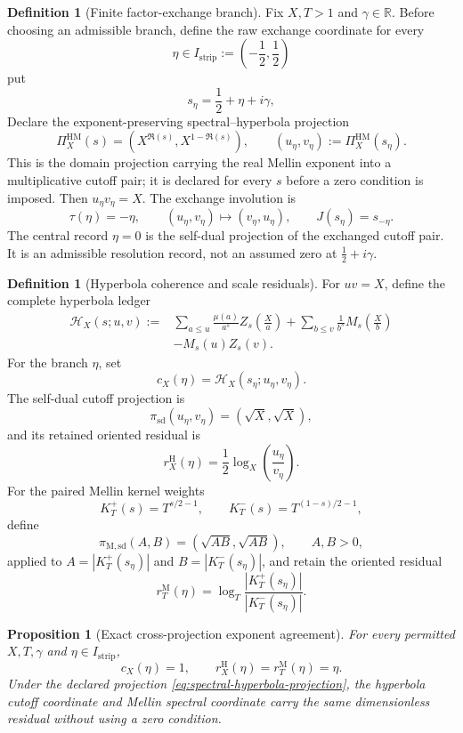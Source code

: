 \documentclass[11pt,a4paper]{article}
\newtheorem{proposition}[theorem]{Proposition}
\theoremstyle{definition}
\newtheorem{definition}[theorem]{Definition}
\newcommand{\Dual}{J}
\begin{document}
\begin{definition}[Finite factor-exchange branch]
\label{def:finite-factor-exchange-branch}
Fix $X,T>1$ and $\gamma\in\mathbb R$. Before choosing an admissible branch,
define the raw exchange coordinate for every
\[
  \eta\in I_{\mathrm{strip}}:=\left(-\frac12,\frac12\right)
\]
put
\[
  s_\eta=\frac12+\eta+i\gamma,
\]
Declare the exponent-preserving spectral--hyperbola projection
\begin{equation}
\label{eq:spectral-hyperbola-projection}
  \Pi_X^{\mathrm{HM}}(s)
  =
  \left(X^{\Re(s)},X^{1-\Re(s)}\right),
  \qquad
  (u_\eta,v_\eta)
  :=
  \Pi_X^{\mathrm{HM}}(s_\eta).
\end{equation}
This is the domain projection carrying the real Mellin exponent into a
multiplicative cutoff pair; it is declared for every $s$ before a zero
condition is imposed.
Then $u_\eta v_\eta=X$. The exchange involution is
\[
  \tau(\eta)=-\eta,
  \qquad
  (u_\eta,v_\eta)\longmapsto(v_\eta,u_\eta),
  \qquad
  \Dual(s_\eta)=s_{-\eta}.
\]
The central record $\eta=0$ is the self-dual projection of the exchanged
cutoff pair. It is an admissible resolution record, not an assumed zero at
$\tfrac12+i\gamma$.
\end{definition}

\begin{definition}[Hyperbola coherence and scale residuals]
\label{def:riemann-persistence-coordinates}
For $uv=X$, define the complete hyperbola ledger
\begin{align*}
  \mathcal H_X(s;u,v)
  :={}&
  \sum_{a\leq u}\frac{\mu(a)}{a^s}
    Z_s\!\left(\frac Xa\right)
  +\sum_{b\leq v}\frac1{b^s}
    M_s\!\left(\frac Xb\right)\\
  &-M_s(u)Z_s(v).
\end{align*}
For the branch $\eta$, set
\[
  c_X(\eta)=\mathcal H_X(s_\eta;u_\eta,v_\eta).
\]
The self-dual cutoff projection is
\[
  \pi_{\mathrm{sd}}(u_\eta,v_\eta)
  =(\sqrt X,\sqrt X),
\]
and its retained oriented residual is
\[
  r_X^{\mathrm H}(\eta)
  =
  \frac12\log_X\!\left(\frac{u_\eta}{v_\eta}\right).
\]
For the paired Mellin kernel weights
\[
  K_T^+(s)=T^{s/2-1},
  \qquad
  K_T^-(s)=T^{(1-s)/2-1},
\]
define
\[
  \pi_{\mathrm{M,sd}}(A,B)=(\sqrt{AB},\sqrt{AB}),
  \qquad A,B>0,
\]
applied to
$A=|K_T^+(s_\eta)|$ and $B=|K_T^-(s_\eta)|$, and retain the oriented residual
\[
  r_T^{\mathrm M}(\eta)
  =
  \log_T
  \frac{|K_T^+(s_\eta)|}{|K_T^-(s_\eta)|}.
\]
\end{definition}

\begin{proposition}[Exact cross-projection exponent agreement]
\label{prop:exact-branch-agreement}
For every permitted $X,T,\gamma$ and $\eta\in I_{\mathrm{strip}}$,
\begin{equation}
\label{eq:exact-branch-agreement}
  c_X(\eta)=1,
  \qquad
  r_X^{\mathrm H}(\eta)
  =r_T^{\mathrm M}(\eta)
  =\eta.
\end{equation}
Under the declared projection \cref{eq:spectral-hyperbola-projection}, the
hyperbola cutoff coordinate and Mellin spectral coordinate carry the same
dimensionless residual without using a zero condition.
\end{proposition}
\end{document}
